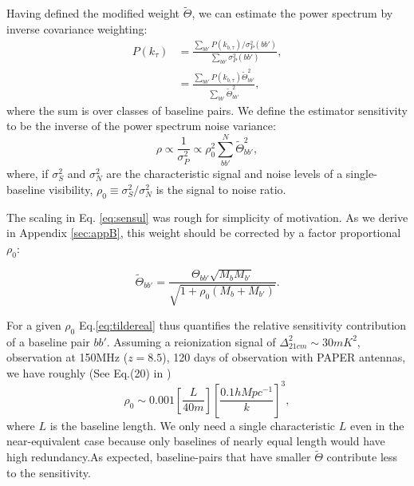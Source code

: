 \documentclass[twocolumn,apj,numberedappendix]{emulateapj}
\renewcommand\[{\begin{equation}}
\renewcommand\]{\end{equation}}
\begin{document}
Having defined the modified weight $\widetilde{\Theta}$, we can estimate the power spectrum by inverse covariance weighting:
\begin{equation}
\begin{aligned}
 P(k_{\tau}) &= \frac{\sum_{bb'}P(k_{b,\tau})/\sigma_P^2(bb')}{\sum_{bb'}\sigma_P^2(bb')}, \\
 &= \frac{\sum_{bb'}P(k_{b,\tau})\widetilde{\Theta}_{bb'}^2}{\sum_{bb'}\widetilde{\Theta}_{bb'}^2},
 \end{aligned}
\end{equation}
where the sum is over classes of baseline pairs. 
We define the estimator sensitivity to be the inverse of the power spectrum noise variance:
\begin{equation}
\rho \propto \frac{1}{\sigma_P^2} \propto \rho_0^2\sum_{bb'}^N\widetilde{\Theta}^2_{bb'},
\end{equation}
where, if $\sigma_S^2$ and $\sigma_N^2$ are the characteristic signal and noise levels of a single-baseline visibility, $\rho_0\equiv\sigma_S^2/\sigma_N^2$ is the signal to noise ratio. 


The scaling in Eq. \ref{eq:sensul} was rough for simplicity of motivation. As we derive in Appendix \ref{sec:appB}, this weight should be corrected by a factor proportional $\rho_0$:

\begin{equation}
\label{eq:tildereal}
\widetilde{\Theta}_{bb'}=\frac{\Theta_{bb'}\sqrt{M_bM_{b'}}}{\sqrt{1 + \rho_0 \left(M_b+M_{b'} \right)}}.
\end{equation}

For a given $\rho_0$ Eq.\ref{eq:tildereal} thus quantifies the relative sensitivity contribution of a baseline pair $bb'$. Assuming a reionization signal of $\Delta_{21cm}^2\sim 30mK^2$, observation at 150MHz ($z=8.5$), 120 days of observation with PAPER antennas, we have roughly
(See Eq.(20) in \cite{first-paper})
\begin{equation}
\rho_0 \sim 0.001\left[\frac{L}{40m}\right] \left[\frac{0.1hMpc^{-1}}{k}\right]^3, 
\end{equation}
where $L$ is the baseline length. We only need a single characteristic $L$ even in the near-equivalent case because only baselines of nearly equal length would have high redundancy.As expected, baseline-pairs that have smaller $\widetilde{\Theta}$ contribute less to the sensitivity. 
\end{document}
